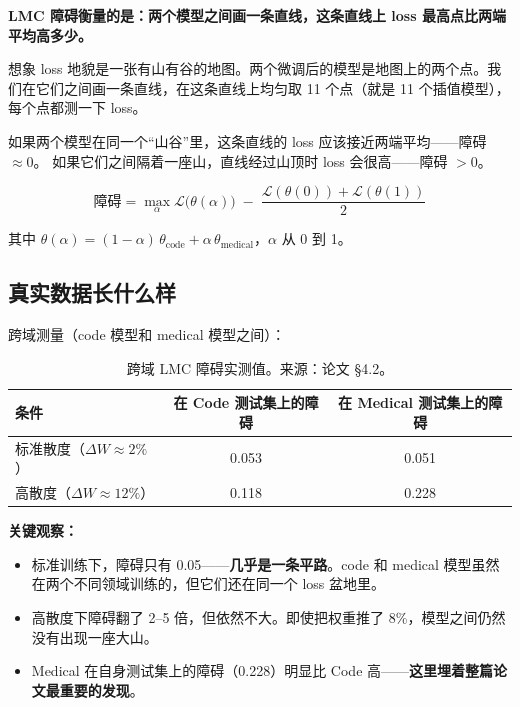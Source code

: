 \documentclass[12pt,a4paper]{ctexart}
\begin{document}
\begin{explainbox}
\textbf{LMC 障碍衡量的是：两个模型之间画一条直线，这条直线上 loss 最高点比两端平均高多少。}

想象 loss 地貌是一张有山有谷的地图。两个微调后的模型是地图上的两个点。我们在它们之间画一条直线，在这条直线上均匀取 11 个点（就是 11 个插值模型），每个点都测一下 loss。

如果两个模型在同一个``山谷''里，这条直线的 loss 应该接近两端平均——障碍 $\approx 0$。
如果它们之间隔着一座山，直线经过山顶时 loss 会很高——障碍 $> 0$。

\[
\text{障碍} = \max_{\alpha} \mathcal{L}\big(\theta(\alpha)\big) \;-\; \frac{\mathcal{L}(\theta(0)) + \mathcal{L}(\theta(1))}{2}
\]

其中 $\theta(\alpha) = (1-\alpha)\,\theta_{\text{code}} + \alpha\,\theta_{\text{medical}}$，$\alpha$ 从 0 到 1。
\end{explainbox}

\subsection*{真实数据长什么样}

跨域测量（code 模型和 medical 模型之间）：

\begin{table}[H]
\centering
\begin{tabular}{lcc}
\toprule
\textbf{条件} & \textbf{在 Code 测试集上的障碍} & \textbf{在 Medical 测试集上的障碍} \\
\midrule
标准散度（$\Delta W\approx2\%$） & 0.053 & 0.051 \\
高散度（$\Delta W\approx12\%$） & 0.118 & 0.228 \\
\bottomrule
\end{tabular}
\caption{跨域 LMC 障碍实测值。来源：论文 \S4.2。}
\end{table}

\textbf{关键观察：}
\begin{itemize}
  \item 标准训练下，障碍只有 0.05——\textbf{几乎是一条平路}。code 和 medical 模型虽然在两个不同领域训练的，但它们还在同一个 loss 盆地里。
  \item 高散度下障碍翻了 2--5 倍，但依然不大。即使把权重推了 8\%，模型之间仍然没有出现一座大山。
  \item Medical 在自身测试集上的障碍（0.228）明显比 Code 高——\textbf{这里埋着整篇论文最重要的发现}。
\end{itemize}

\end{document}
